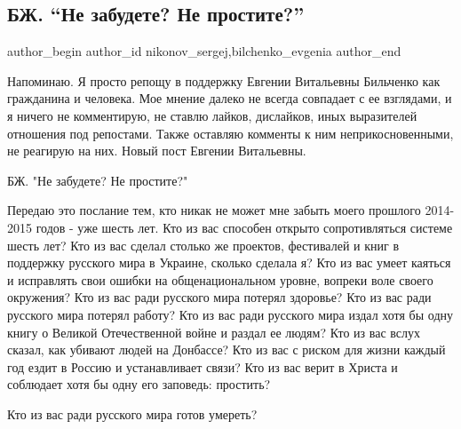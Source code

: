  
 
 
 
 
 
\subsection{БЖ. \enquote{Не забудете? Не простите?}}
\label{sec:13_09_2021.fb.nikonov_sergej.1.bilchenko_ne_zabudete_ne_prostite}
 
\ifcmt
 author_begin
   author_id nikonov_sergej,bilchenko_evgenia
 author_end
\fi

Напоминаю. Я просто репощу в поддержку Евгении Витальевны Бильченко как
гражданина и человека. Мое мнение далеко не всегда совпадает с ее взглядами, и
я ничего не комментирую, не ставлю лайков, дислайков, иных выразителей
отношения под репостами. Также оставляю комменты к ним неприкосновенными, не
реагирую на них.  Новый пост Евгении Витальевны. 

БЖ. "Не забудете? Не простите?"

Передаю это послание тем, кто никак не может мне забыть моего прошлого
2014-2015 годов - уже шесть лет. Кто из вас способен открыто сопротивляться
системе шесть лет? Кто из вас сделал столько же проектов, фестивалей и книг в
поддержку русского мира в Украине, сколько сделала я? Кто из вас умеет каяться
и исправлять свои ошибки на общенациональном уровне, вопреки воле своего
окружения? Кто из вас ради русского мира потерял здоровье? Кто из вас ради
русского мира потерял работу? Кто из вас ради русского мира издал хотя бы одну
книгу о Великой Отечественной войне и раздал ее людям? Кто из вас вслух сказал,
как убивают людей на Донбассе? Кто из вас с риском для жизни каждый год ездит в
Россию и устанавливает связи? Кто из вас верит в Христа и соблюдает хотя бы
одну его заповедь: простить?


Кто из вас ради русского мира готов умереть?

